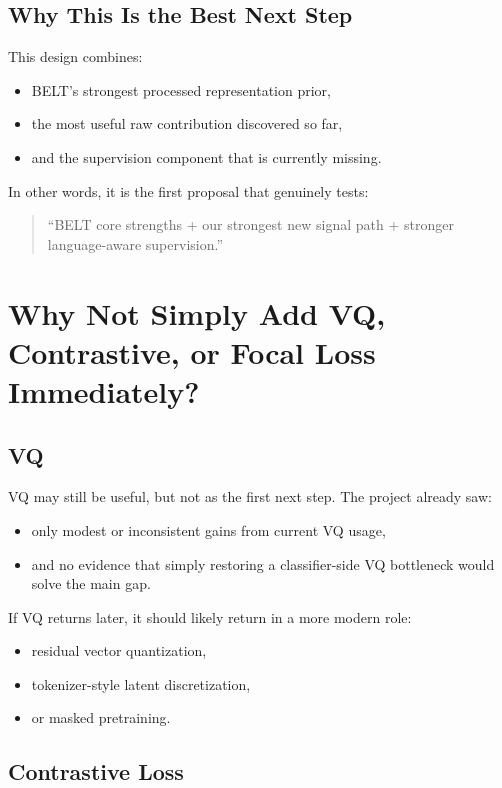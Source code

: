 \documentclass[11pt]{article}
\begin{document}
\subsection{Why This Is the Best Next Step}

This design combines:
\begin{itemize}
    \item BELT's strongest processed representation prior,
    \item the most useful raw contribution discovered so far,
    \item and the supervision component that is currently missing.
\end{itemize}

In other words, it is the first proposal that genuinely tests:
\begin{quote}
``BELT core strengths + our strongest new signal path + stronger language-aware supervision.''
\end{quote}

\section{Why Not Simply Add VQ, Contrastive, or Focal Loss Immediately?}

\subsection{VQ}

VQ may still be useful, but not as the first next step. The project already saw:
\begin{itemize}
    \item only modest or inconsistent gains from current VQ usage,
    \item and no evidence that simply restoring a classifier-side VQ bottleneck would solve the main gap.
\end{itemize}

If VQ returns later, it should likely return in a more modern role:
\begin{itemize}
    \item residual vector quantization,
    \item tokenizer-style latent discretization,
    \item or masked pretraining.
\end{itemize}

\subsection{Contrastive Loss}
\end{document}
